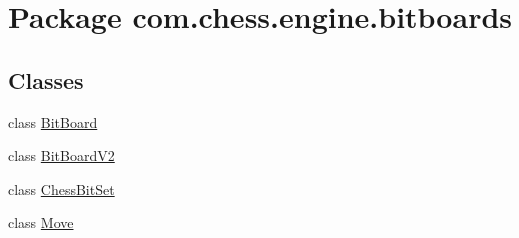 \hypertarget{namespacecom_1_1chess_1_1engine_1_1bitboards}{}\section{Package com.\+chess.\+engine.\+bitboards}
\label{namespacecom_1_1chess_1_1engine_1_1bitboards}
\subsection*{Classes}
\begin{DoxyCompactItemize}
\item 
class \mbox{\hyperlink{classcom_1_1chess_1_1engine_1_1bitboards_1_1_bit_board}{Bit\+Board}}
\item 
class \mbox{\hyperlink{classcom_1_1chess_1_1engine_1_1bitboards_1_1_bit_board_v2}{Bit\+Board\+V2}}
\item 
class \mbox{\hyperlink{classcom_1_1chess_1_1engine_1_1bitboards_1_1_chess_bit_set}{Chess\+Bit\+Set}}
\item 
class \mbox{\hyperlink{classcom_1_1chess_1_1engine_1_1bitboards_1_1_move}{Move}}
\end{DoxyCompactItemize}
